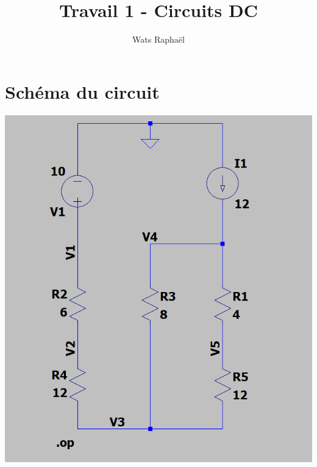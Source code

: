\documentclass{homeworg}
\title{Travail 1 - Circuits DC}
\author{Wats Raphaël}
\begin{document}
\maketitle

\section{Schéma du circuit}
    \begin{center}
        \includegraphics[scale=0.7]{Shematic.PNG}
    \end{center}
\end{document}
